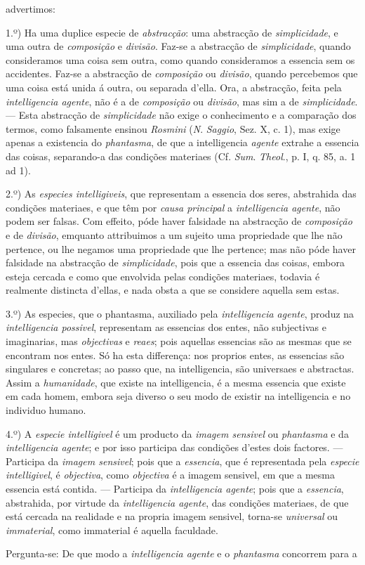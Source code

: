 advertimos:\par 1.º) Ha uma duplice especie de \emph{abstracção}: uma abstracção de \emph{simplicidade}, e uma outra de \emph{composição} e \emph{divisão}. Faz-se a abstracção de \emph{simplici}\emph{dade}, quando consideramos uma coisa sem outra, como quando consideramos a essencia sem os accidentes. Faz-se a abstracção de \emph{composição} ou \emph{divisão}, quando percebemos que uma coisa está unida á outra, ou separada d'ella. Ora, a abstracção, feita pela \emph{intelligencia agente}, não é a de \emph{composição} ou \emph{divisão}, mas sim a de \emph{simplicidade}. --- Esta abstracção de \emph{simplicidade} não exige o conhecimento e a comparação dos termos, como falsamente ensinou \emph{Rosmini} (\emph{N}. \emph{Saggio}, Sez. X, c. 1), mas exige apenas a existencia do \emph{phantasma}, de que a intelligencia \emph{agente} extrahe a essencia das coisas, separando-a das condições materiaes (Cf. \emph{Sum}. \emph{Theol}., p. I, q. 85, a. 1 ad 1).\par 2.º) As \emph{especies intelligiveis}, que representam a essencia dos seres, abstrahida das condições materiaes, e que têm por \emph{causa principal} a \emph{intelligencia agente}, não podem ser falsas. Com effeito, póde haver falsidade na abstracção de \emph{composição} e de \emph{divisão}, emquanto attribuimos a um sujeito uma propriedade que lhe não pertence, ou lhe negamos uma propriedade que lhe pertence; mas não póde haver falsidade na abstracção de \emph{simplicidade}, pois que a essencia das coisas, embora esteja cercada e como que envolvida pelas condições materiaes, todavia é realmente distincta d'ellas, e nada obsta a que se considere aquella sem estas.\par 3.º) As especies, que o phantasma, auxiliado pela \emph{intelligencia agente}, produz na \emph{intelligencia possivel}, representam as essencias dos entes, não subjectivas e imaginarias, mas \emph{objectivas} e \emph{reaes}; pois aquellas essencias são as mesmas que se encontram nos entes. Só ha esta differença: nos proprios entes, as essencias são singulares e concretas; ao passo que, na intelligencia, são universaes e abstractas. Assim a \emph{humanidade}, que existe na intelligencia, é a mesma essencia que existe em cada homem, embora seja diverso o seu modo de existir na intelligencia e no individuo humano.\par 4.º) A \emph{especie intelligivel} é um producto da \emph{imagem sensivel} ou \emph{phantasma} e da \emph{intelligencia agente}; e por isso participa das condições d'estes dois factores. --- Participa da \emph{imagem sensivel}; pois que a \emph{essencia}, que é representada pela \emph{especie intelligivel}, é \emph{objectiva}, como \emph{objectiva} é a imagem sensivel, em que a mesma essencia está contida. --- Participa da \emph{intelligencia agente}; pois que a \emph{essencia}, abstrahida, por virtude da \emph{intelligencia agente}, das condições materiaes, de que está cercada na realidade e na propria imagem sensivel, torna-se \emph{universal} ou \emph{immaterial}, como immaterial é aquella faculdade.\par Pergunta-se: De que modo a \emph{intelligencia agente} e o \emph{phantasma} concorrem para a 